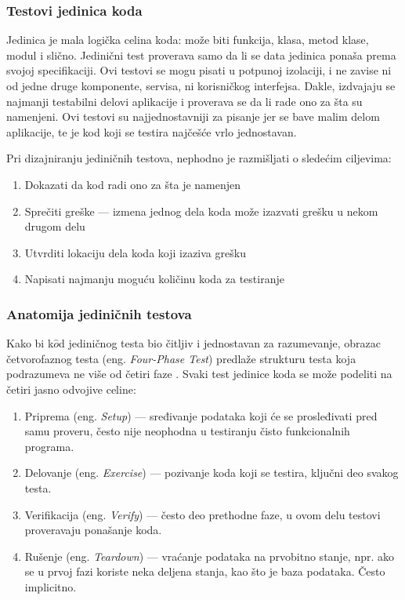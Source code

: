 \documentclass[12pt,oneside]{memoir}
\begin{document}
\subsubsection{Testovi jedinica koda}
\par Jedinica je mala logička celina koda: može biti funkcija, klasa, metod klase, modul i slično. Jedinični test proverava samo da li se data jedinica ponaša prema svojoj specifikaciji. Ovi testovi se mogu pisati u potpunoj izolaciji, i ne zavise ni od jedne druge komponente, servisa, ni korisničkog interfejsa. Dakle, izdvajaju se najmanji testabilni delovi aplikacije i proverava se da li rade ono za šta su namenjeni. Ovi testovi su najjednostavniji za pisanje jer se bave malim delom aplikacije, te je kod koji se testira najčešće vrlo jednostavan. 
\par Pri dizajniranju jediničnih testova, nephodno je razmišljati o sledećim ciljevima: 
\begin{enumerate}
\item Dokazati da kod radi ono za šta je namenjen
\item Sprečiti greške --- izmena jednog dela koda može izazvati grešku u nekom drugom delu
\item Utvrditi lokaciju dela koda koji izaziva grešku
\item Napisati najmanju moguću količinu koda za testiranje
\end{enumerate}

\subsubsection{Anatomija jediničnih testova}
\par Kako bi k$\hat{o}$d jediničnog testa bio čitljiv i jednostavan za razumevanje, obrazac četvorofaznog testa (eng. \emph{Four-Phase Test}) predlaže strukturu testa koja podrazumeva ne više od četiri faze \cite{4phase}. Svaki test jedinice koda se može podeliti na četiri jasno odvojive celine:  
\begin{enumerate}
\item Priprema (eng. \emph{Setup}) --- sređivanje podataka koji će se prosleđivati pred samu proveru, često nije neophodna u testiranju čisto funkcionalnih programa.
\item Delovanje (eng. \emph{Exercise}) --- pozivanje koda koji se testira, ključni deo svakog testa.
\item Verifikacija (eng. \emph{Verify}) --- često deo prethodne faze, u ovom delu testovi proveravaju ponašanje koda. 
\item Rušenje (eng. \emph{Teardown}) --- vraćanje podataka na prvobitno stanje, npr. ako se u prvoj fazi koriste neka deljena stanja, kao što je baza podataka. Često implicitno. 
\end{enumerate}
\end{document}
